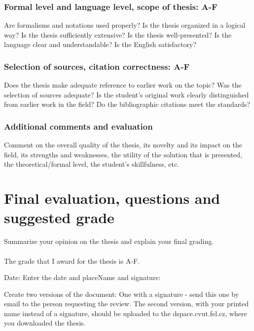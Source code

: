 \documentclass{article}
\begin{document}
\subsubsection*{Formal level and language level, scope of thesis: A-F} %
Are formalisms and notations used properly? Is the thesis organized in a logical way? Is the thesis sufficiently extensive? Is the thesis well-presented? Is the language clear and understandable? Is the English satisfactory?

\subsubsection*{Selection of sources, citation correctness: A-F} %
Does the thesis make adequate reference to earlier work on the topic? Was the selection of sources adequate? Is the student’s original work clearly distinguished from earlier work in the field? Do the bibliographic citations meet the standards?

\subsubsection*{Additional comments and evaluation} %
Comment on the overall quality of the thesis, its novelty and its impact on the field, its strengths and weaknesses, the utility of the solution that is presented, the theoretical/formal level, the student’s skillfulness, etc.

\section{Final evaluation, questions and suggested grade}
Summarize your opinion on the thesis and explain your final grading.\\
\\\vspace{5mm}
The grade that I award for the thesis is A-F. %
\vspace{5mm}

Date: Enter the date and place\hfill                       Name and signature:\hspace{2cm}
\vspace{5mm}

Create two versions of the document: One with a signature - send this one by email to the person requesting the review. The second version, with your printed name instead of a signature, should be uploaded to the dspace.cvut.fel.cz, where you downloaded the thesis.
\end{document}
